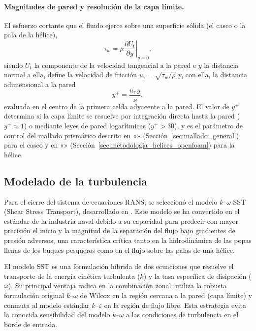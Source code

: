 \paragraph{Magnitudes de pared y resolución de la capa límite.}
El esfuerzo cortante que el fluido ejerce sobre una superficie sólida (el casco o la pala de la hélice),
%
\begin{equation}\label{eq:tauw}
    \tau_w = \mu \left.\frac{\partial U_t}{\partial y}\right|_{y=0} ,
\end{equation}
%
siendo $U_t$ la componente de la velocidad tangencial a la pared e $y$ la
distancia normal a ella, define la velocidad de fricción
$u_\tau = \sqrt{\tau_w/\rho}$ y, con ella, la distancia adimensional a la
pared
%
\begin{equation}\label{eq:yplus}
    y^+ = \frac{u_\tau\, y}{\nu} ,
\end{equation}
%
evaluada en el centro de la primera celda adyacente a la pared. El valor de
$y^+$ determina si la capa límite se resuelve por integración directa hasta
la pared ($y^+ \approx 1$) o mediante leyes de pared logarítmicas
($y^+ > 30$), y es el parámetro de control del mallado prismático descrito en «» (Sección~\ref{sec:mallado_general}) para el casco y en «» (Sección~\ref{sec:metodologia_helices_openfoam}) para la hélice.
 
\subsection{Modelado de la turbulencia}
\label{sec:metodo_SST}

Para el cierre del sistema de ecuaciones RANS, se seleccionó el modelo $k$--$\omega$ SST (Shear Stress Transport), desarrollado en \citet{Menter1994}. Este modelo se ha convertido en el estándar de la industria naval debido a su capacidad para predecir con mayor precisión el inicio y la magnitud de la separación del flujo bajo gradientes de presión adversos, una característica crítica tanto en la hidrodinámica de las popas llenas de los buques pesqueros como en el flujo sobre las palas de una hélice.

El modelo SST es una formulación híbrida de dos ecuaciones que resuelve el transporte de la energía cinética turbulenta ($k$) y la tasa específica de disipación ($\omega$). Su principal ventaja radica en la combinación zonal: utiliza la robusta formulación original $k$--$\omega$ de Wilcox en la región cercana a la pared (capa límite) y conmuta al modelo estándar $k$--$\varepsilon$ en la región de flujo libre. Esta estrategia evita la conocida sensibilidad del modelo $k$--$\omega$ a las condiciones de turbulencia en el borde de entrada.

